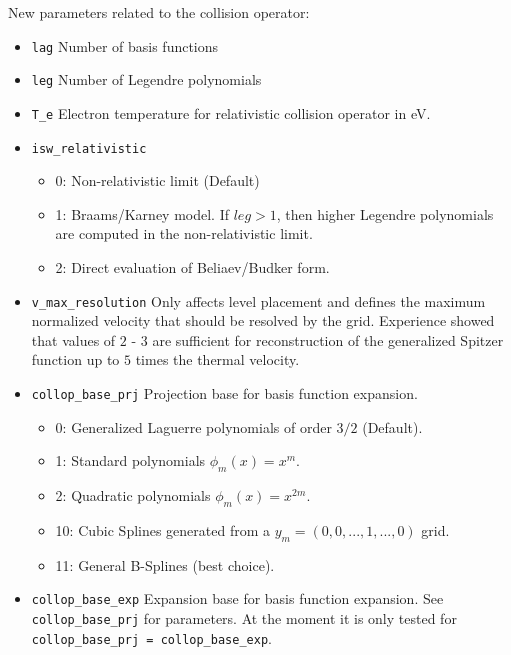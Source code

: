 \documentclass{article}
\begin{document}
New parameters related to the collision operator:
\begin{itemize}
 \item \verb|lag|\newline
 Number of basis functions
 \item \verb|leg|\newline
 Number of Legendre polynomials
 \item \verb|T_e|\newline
 Electron temperature for relativistic collision operator in eV.
 \item \verb|isw_relativistic|
 \begin{itemize}
  \item 0: Non-relativistic limit (Default)
  \item 1: Braams/Karney model. If $leg>1$, then higher Legendre
  polynomials are computed in the non-relativistic limit.
  \item 2: Direct evaluation of Beliaev/Budker form.
 \end{itemize}
 \item \verb|v_max_resolution|\newline
 Only affects level placement and defines the maximum normalized
 velocity that should be resolved by the grid. Experience showed that
 values of $2$ - $3$ are sufficient for reconstruction of the
 generalized Spitzer function up to $5$ times the thermal velocity.
 \item \verb|collop_base_prj|\newline
 Projection base for basis function expansion.
 \begin{itemize}
  \item 0: Generalized Laguerre polynomials of order $3/2$ (Default).
  \item 1: Standard polynomials $\phi_m(x) = x^m$.
  \item 2: Quadratic polynomials $\phi_m(x) = x^{2m}$.
  \item 10: Cubic Splines generated from a $y_m = (0, 0, ..., 1, ..., 0)$ grid.
  \item 11: General B-Splines (best choice).
 \end{itemize}

 \item \verb|collop_base_exp|\newline
 Expansion base for basis function expansion. See \verb|collop_base_prj|
 for parameters. At the moment it is only tested for
 \verb|collop_base_prj = collop_base_exp|.


\end{itemize}
\end{document}
